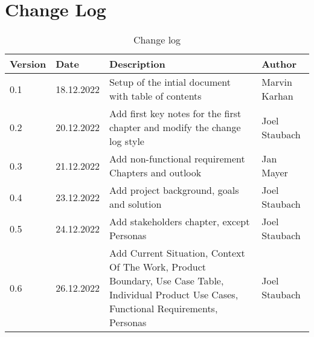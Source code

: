 \chapter{Change Log}

\sffamily
\begin{footnotesize}
  \renewcommand{\arraystretch}{1.4}
  \begin{longtable}[L L L L]{ p{} p{} p{} p{} }
    \caption                       %
    {Change log} %
    \\
    \toprule
    \textbf{Version} & \textbf{Date} & \textbf{Description}                                                                                                                          & \textbf{Author} \\
    \midrule
    0.1              & 18.12.2022    & Setup of the intial document with table of contents                                                                                           & Marvin Karhan   \\

    \rowcolor{Gray}
    0.2              & 20.12.2022    & Add first key notes for the first chapter and modify the change log style                                                                     & Joel Staubach   \\

    0.3              & 21.12.2022    & Add non-functional requirement Chapters and outlook                                                                                           & Jan Mayer       \\

    \rowcolor{Gray}
    0.4              & 23.12.2022    & Add project background, goals and solution                                                                                                    & Joel Staubach   \\

    0.5              & 24.12.2022    & Add stakeholders chapter, except Personas                                                                                                     & Joel Staubach   \\

    \rowcolor{Gray}
    0.6              & 26.12.2022    & Add Current Situation, Context Of The Work, Product Boundary, Use Case Table, Individual Product Use Cases, Functional Requirements, Personas & Joel Staubach   \\


\end{longtable}
\end{footnotesize}
